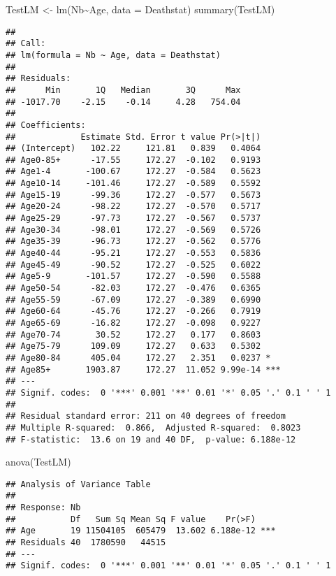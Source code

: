 \documentclass[
]{article}
\newenvironment{Shaded}{\begin{snugshade}}{\end{snugshade}}
\newcommand{\AttributeTok}[1]{\textcolor[rgb]{0.77,0.63,0.00}{#1}}
\newcommand{\FunctionTok}[1]{\textcolor[rgb]{0.00,0.00,0.00}{#1}}
\newcommand{\NormalTok}[1]{#1}
\newcommand{\OtherTok}[1]{\textcolor[rgb]{0.56,0.35,0.01}{#1}}
\newcommand{\SpecialCharTok}[1]{\textcolor[rgb]{0.00,0.00,0.00}{#1}}
\begin{document}
\begin{Shaded}
\begin{Highlighting}[]
\NormalTok{TestLM }\OtherTok{\textless{}{-}} \FunctionTok{lm}\NormalTok{(Nb}\SpecialCharTok{\textasciitilde{}}\NormalTok{Age, }\AttributeTok{data =}\NormalTok{ Deathstat)}
\FunctionTok{summary}\NormalTok{(TestLM)}
\end{Highlighting}
\end{Shaded}

\begin{verbatim}
## 
## Call:
## lm(formula = Nb ~ Age, data = Deathstat)
## 
## Residuals:
##      Min       1Q   Median       3Q      Max 
## -1017.70    -2.15    -0.14     4.28   754.04 
## 
## Coefficients:
##             Estimate Std. Error t value Pr(>|t|)    
## (Intercept)   102.22     121.81   0.839   0.4064    
## Age0-85+      -17.55     172.27  -0.102   0.9193    
## Age1-4       -100.67     172.27  -0.584   0.5623    
## Age10-14     -101.46     172.27  -0.589   0.5592    
## Age15-19      -99.36     172.27  -0.577   0.5673    
## Age20-24      -98.22     172.27  -0.570   0.5717    
## Age25-29      -97.73     172.27  -0.567   0.5737    
## Age30-34      -98.01     172.27  -0.569   0.5726    
## Age35-39      -96.73     172.27  -0.562   0.5776    
## Age40-44      -95.21     172.27  -0.553   0.5836    
## Age45-49      -90.52     172.27  -0.525   0.6022    
## Age5-9       -101.57     172.27  -0.590   0.5588    
## Age50-54      -82.03     172.27  -0.476   0.6365    
## Age55-59      -67.09     172.27  -0.389   0.6990    
## Age60-64      -45.76     172.27  -0.266   0.7919    
## Age65-69      -16.82     172.27  -0.098   0.9227    
## Age70-74       30.52     172.27   0.177   0.8603    
## Age75-79      109.09     172.27   0.633   0.5302    
## Age80-84      405.04     172.27   2.351   0.0237 *  
## Age85+       1903.87     172.27  11.052 9.99e-14 ***
## ---
## Signif. codes:  0 '***' 0.001 '**' 0.01 '*' 0.05 '.' 0.1 ' ' 1
## 
## Residual standard error: 211 on 40 degrees of freedom
## Multiple R-squared:  0.866,  Adjusted R-squared:  0.8023 
## F-statistic:  13.6 on 19 and 40 DF,  p-value: 6.188e-12
\end{verbatim}

\begin{Shaded}
\begin{Highlighting}[]
\FunctionTok{anova}\NormalTok{(TestLM)}
\end{Highlighting}
\end{Shaded}

\begin{verbatim}
## Analysis of Variance Table
## 
## Response: Nb
##           Df   Sum Sq Mean Sq F value    Pr(>F)    
## Age       19 11504105  605479  13.602 6.188e-12 ***
## Residuals 40  1780590   44515                      
## ---
## Signif. codes:  0 '***' 0.001 '**' 0.01 '*' 0.05 '.' 0.1 ' ' 1
\end{verbatim}
\end{document}

